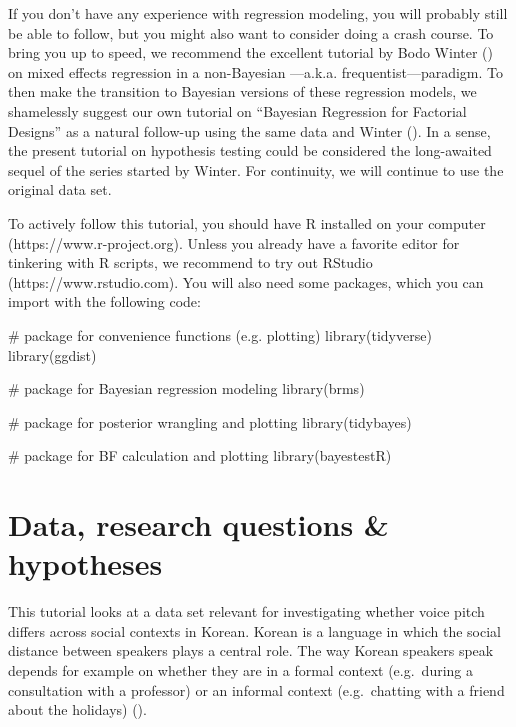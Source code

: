 \documentclass[
  doc,
  longtable,
  nolmodern,
  notxfonts,
  notimes,
  colorlinks=true,linkcolor=blue,citecolor=blue,urlcolor=blue]{apa7}
\newenvironment{Shaded}{\begin{snugshade}}{\end{snugshade}}
\newcommand{\CommentTok}[1]{\textcolor[rgb]{0.37,0.37,0.37}{#1}}
\newcommand{\FunctionTok}[1]{\textcolor[rgb]{0.28,0.35,0.67}{#1}}
\newcommand{\NormalTok}[1]{\textcolor[rgb]{0.00,0.23,0.31}{#1}}
\begin{document}
If you don't have any experience with regression modeling, you will
probably still be able to follow, but you might also want to consider
doing a crash course. To bring you up to speed, we recommend the
excellent tutorial by Bodo Winter
() on mixed eﬀects
regression in a non-Bayesian ---a.k.a. frequentist---paradigm. To then
make the transition to Bayesian versions of these regression models, we
shamelessly suggest our own tutorial on ``Bayesian Regression for
Factorial Designs'' as a natural follow-up using the same data and
Winter (). In a sense, the present tutorial on hypothesis testing
could be considered the long-awaited sequel of the series started by
Winter. For continuity, we will continue to use the original data set.

To actively follow this tutorial, you should have R installed on your
computer (https://www.r-project.org). Unless you already have a favorite
editor for tinkering with R scripts, we recommend to try out RStudio
(https://www.rstudio.com). You will also need some packages, which you
can import with the following code:

\begin{Shaded}
\begin{Highlighting}[]
\CommentTok{\# package for convenience functions (e.g. plotting)}
\FunctionTok{library}\NormalTok{(tidyverse)}
\FunctionTok{library}\NormalTok{(ggdist)}

\CommentTok{\# package for Bayesian regression modeling}
\FunctionTok{library}\NormalTok{(brms)}

\CommentTok{\# package for posterior wrangling and plotting}
\FunctionTok{library}\NormalTok{(tidybayes)}

\CommentTok{\# package for BF calculation and plotting}
\FunctionTok{library}\NormalTok{(bayestestR)}
\end{Highlighting}
\end{Shaded}

\section{Data, research questions \&
hypotheses}\label{data-research-questions-hypotheses}

This tutorial looks at a data set relevant for investigating whether
voice pitch diﬀers across social contexts in Korean. Korean is a
language in which the social distance between speakers plays a central
role. The way Korean speakers speak depends for example on whether they
are in a formal context (e.g.~during a consultation with a professor) or
an informal context (e.g.~chatting with a friend about the holidays)
().
\end{document}
